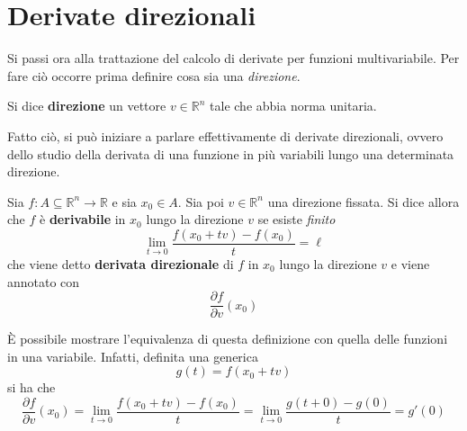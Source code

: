 \section{Derivate direzionali}
Si passi ora alla trattazione del calcolo di derivate per funzioni multivariabile. Per fare ciò occorre prima definire cosa sia una \textit{direzione}.
\begin{definition} \label{Def: Direzione}
    Si dice \textbf{direzione} un vettore $v \in \mathbb{R}^n$ tale che abbia norma unitaria. 
\end{definition}
Fatto ciò, si può iniziare a parlare effettivamente di derivate direzionali, ovvero dello studio della derivata di una funzione in più variabili lungo una determinata direzione.
\begin{definition}
    Sia $f: A \subseteq \mathbb{R}^n \to \mathbb{R}$ e sia $x_0 \in A$. Sia poi $v \in \mathbb{R}^n$ una direzione fissata.
    Si dice allora che $f$ è \textbf{derivabile} in $x_0$ lungo la direzione $v$ se esiste \textit{finito}
    \begin{equation}
        \lim_{t \to 0}{\frac{f(x_0+tv)-f(x_0)}{t}}= \ell
    \end{equation}
    che viene detto \textbf{derivata direzionale} di $f$ in $x_0$ lungo la direzione $v$ e viene annotato con 
    \begin{equation}
        \frac{\partial{f}}{\partial{v}}(x_0)
    \end{equation}
\begin{oss}
    È possibile mostrare l'equivalenza di questa definizione con quella delle funzioni in una variabile. Infatti, definita una generica
    \begin{equation}
        g(t)=f(x_0+tv)
    \end{equation}
    si ha che 
    \begin{equation}
        \frac{\partial{f}}{\partial{v}}(x_0) = \lim_{t \to 0}{\frac{f(x_0+tv)-f(x_0)}{t}} = \lim_{t \to 0}{\frac{g(t+0)-g(0)}{t}}=g'(0)
    \end{equation}
\end{oss}
\end{definition}
